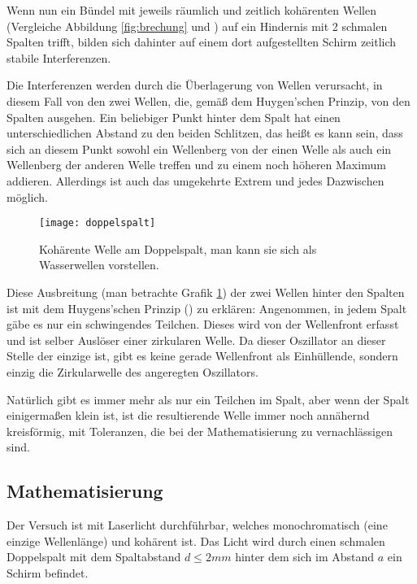 Wenn nun ein Bündel mit jeweils räumlich und zeitlich kohärenten Wellen (Vergleiche Abbildung \ref{fig:brechung} und ) auf ein Hindernis mit 2 schmalen Spalten trifft, bilden sich dahinter auf einem dort aufgestellten Schirm zeitlich stabile Interferenzen.

Die Interferenzen werden durch die Überlagerung von Wellen verursacht, in diesem Fall von den zwei Wellen, die, gemäß dem Huygen'schen Prinzip, von den Spalten ausgehen. Ein beliebiger Punkt hinter dem Spalt hat einen unterschiedlichen Abstand zu den beiden Schlitzen, das heißt es kann sein, dass sich an diesem Punkt sowohl ein Wellenberg von der einen Welle als auch ein Wellenberg der anderen Welle treffen und zu einem noch höheren Maximum addieren. Allerdings ist auch das umgekehrte Extrem und jedes Dazwischen möglich.

\begin{figure}[!h]
	\center
	\texttt{[image: doppelspalt]}
	\caption{Kohärente Welle am Doppelspalt, man kann sie sich als Wasserwellen vorstellen.}
	\label{fig:doppelspaltwasser}
\end{figure}

Diese Ausbreitung (man betrachte Grafik \ref{fig:doppelspaltwasser}) der zwei Wellen hinter den Spalten ist mit dem Huygens'schen Prinzip () zu erklären: Angenommen, in jedem Spalt gäbe es nur ein schwingendes Teilchen. Dieses wird von der Wellenfront erfasst und ist selber Auslöser einer zirkularen Welle. Da dieser Oszillator an dieser Stelle der einzige ist, gibt es keine gerade Wellenfront als Einhüllende, sondern einzig die Zirkularwelle des angeregten Oszillators.

Natürlich gibt es immer mehr als nur ein Teilchen im Spalt, aber wenn der Spalt einigermaßen klein ist, ist die resultierende Welle immer noch annähernd kreisförmig, mit Toleranzen, die bei der Mathematisierung zu vernachlässigen sind.


\subsection{Mathematisierung}

Der Versuch ist mit Laserlicht durchführbar, welches monochromatisch (eine einzige Wellenlänge) und kohärent ist. Das Licht wird durch einen schmalen Doppelspalt mit dem Spaltabstand $d \leq 2mm$ hinter dem sich im Abstand $a$ ein Schirm befindet. 
	
